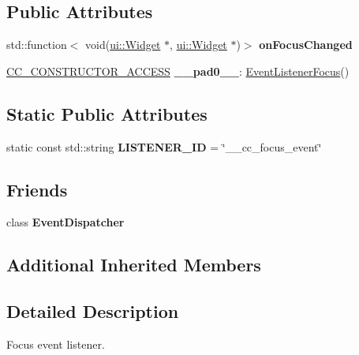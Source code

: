 \subsection*{Public Attributes}
\begin{DoxyCompactItemize}
\item 
\mbox{\label{classEventListenerFocus_a640bc119896ae640d0171b3c05e281e5}} 
std\+::function$<$ void(\hyperlink{classui_1_1Widget}{ui\+::\+Widget} $\ast$, \hyperlink{classui_1_1Widget}{ui\+::\+Widget} $\ast$)$>$ {\bfseries on\+Focus\+Changed}
\item 
\mbox{\label{classEventListenerFocus_a31fbac21d9ba1d0ff92b6ea691a55329}} 
\hyperlink{_2cocos2d_2cocos_2base_2ccConfig_8h_a25ef1314f97c35a2ed3d029b0ead6da0}{C\+C\+\_\+\+C\+O\+N\+S\+T\+R\+U\+C\+T\+O\+R\+\_\+\+A\+C\+C\+E\+SS} {\bfseries \+\_\+\+\_\+pad0\+\_\+\+\_\+}\+: \hyperlink{classEventListenerFocus}{Event\+Listener\+Focus}()
\end{DoxyCompactItemize}
\subsection*{Static Public Attributes}
\begin{DoxyCompactItemize}
\item 
\mbox{\label{classEventListenerFocus_a41cc4114e934cf8ce447c321e47235f3}} 
static const std\+::string {\bfseries L\+I\+S\+T\+E\+N\+E\+R\+\_\+\+ID} = \char`\"{}\+\_\+\+\_\+cc\+\_\+focus\+\_\+event\char`\"{}
\end{DoxyCompactItemize}
\subsection*{Friends}
\begin{DoxyCompactItemize}
\item 
\mbox{\label{classEventListenerFocus_a7de0ed02fc316d9e73b7eb3def69c105}} 
class {\bfseries Event\+Dispatcher}
\end{DoxyCompactItemize}
\subsection*{Additional Inherited Members}


\subsection{Detailed Description}
Focus event listener. 

